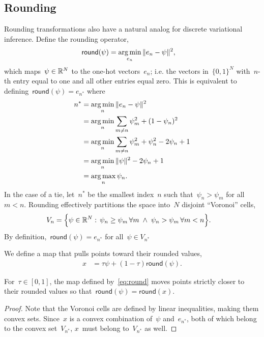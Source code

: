 \documentclass[twoside]{article}
\begin{document}
\subsection{Rounding}
Rounding transformations also have a natural analog for discrete
variational inference.  Define the rounding operator,
\begin{align*}
  \mathsf{round}(\psi)
  &= \argmin_{e_n} \| e_n - \psi \|^2,
\end{align*}
which maps~${\psi \in \mathbb{R}^N}$ to the one-hot vectors~${e_n}$;
i.e. the vectors in~${\{0,1\}^N}$ with~$n$-th entry equal to one and
all other entries equal zero.  This is equivalent to
defining~${\mathsf{round}(\psi) = e_{n^*}}$ where
\begin{align*}
  n^* &= \argmin_{n} \|e_n - \psi \|^2 \\
  &= \argmin_{n} \sum_{m \neq n} \psi_m^2 + (1 - \psi_n)^2  \\
  &= \argmin_{n} \sum_{m \neq n} \psi_m^2 + \psi_n^2 - 2\psi_n + 1 \\
  &= \argmin_{n} \|\psi\|^2 - 2\psi_n + 1 \\
  &= \argmax_n \psi_n.
\end{align*}
In the case of a tie, let~$n^*$ be the smallest index~$n$ such
that~$\psi_n > \psi_m$ for all~$m < n$. Rounding effectively
partitions the space into~$N$ disjoint ``Voronoi'' cells,
\begin{align*}
  V_n &= \Big \{ \psi \in \mathbb{R}^N : \,
        \psi_n \geq \psi_m \, \forall m \; \wedge \;
        \psi_n > \psi_m \, \forall m < n
        \Big \}.
\end{align*}
By definition,~${\mathsf{round}(\psi) = e_{n^*}}$ for
all~${\psi \in V_{n^*}}$


We define a map that pulls points toward their rounded values,
\begin{align}
  \label{eq:round}
  x &=  \tau \psi + (1-\tau) \mathsf{round}(\psi).
\end{align}

\begin{proposition}
  \label{prop:round}
  For~${\tau \in [0,1]}$, the map defined by~\eqref{eq:round} moves
  points strictly closer to their rounded values so
  that~$\mathsf{round}(\psi) = \mathsf{round}(x)$.
\end{proposition}

\begin{proof}
  Note that the Voronoi cells are defined by linear inequalities,
  making them convex sets.  Since~$x$ is a convex combination
  of~$\psi$ and~$e_{n^*}$, both of which belong to the convex
  set~$V_{n^*}$, $x$~must belong to~$V_{n^*}$ as well.
\end{proof}
\end{document}
